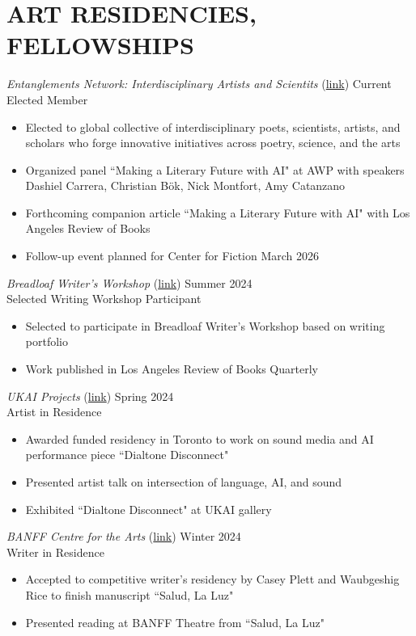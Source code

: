\section{ART RESIDENCIES,  FELLOWSHIPS}

{\sl Entanglements Network: Interdisciplinary Artists and Scientits} (\href{https://www.the-entanglements-network.com/}{link})\hfill
Current \\
Elected Member  \\
\begin{itemize}
\item Elected to global collective of interdisciplinary poets, scientists, artists, and scholars
who forge innovative initiatives across poetry, science, and the arts 
\item Organized panel ``Making a Literary Future with AI" at AWP with speakers Dashiel Carrera, Christian B\"ok, Nick Montfort, Amy Catanzano
\item Forthcoming companion article ``Making a Literary Future with AI" with Los Angeles Review of Books
\item Follow-up event planned for Center for Fiction March 2026
\end{itemize}

{\sl Breadloaf Writer's Workshop} (\href{https://www.middlebury.edu/writers-conferences/}{link})\hfill
Summer 2024 \\
Selected Writing Workshop Participant \\
\begin{itemize}
\item Selected to participate in Breadloaf Writer's Workshop based on writing portfolio
\item Work published in Los Angeles Review of Books Quarterly
\end{itemize}

{\sl UKAI Projects} (\href{https://ukaiprojects.com/}{link})\hfill
Spring 2024 \\
Artist in Residence  \\
\begin{itemize}
\item Awarded funded residency in Toronto to work on sound media and AI performance piece ``Dialtone Disconnect" 
\item Presented artist talk on intersection of language, AI, and sound
\item Exhibited ``Dialtone Disconnect" at UKAI gallery
\end{itemize}

{\sl BANFF Centre for the Arts} (\href{https://www.banffcentre.ca/literary-arts}{link})\hfill
Winter 2024 \\
Writer in Residence  \\
\begin{itemize}
\item Accepted to competitive writer's residency by Casey Plett and Waubgeshig Rice to finish manuscript ``Salud, La Luz" 
\item Presented reading at BANFF Theatre from ``Salud, La Luz" 
\end{itemize}


